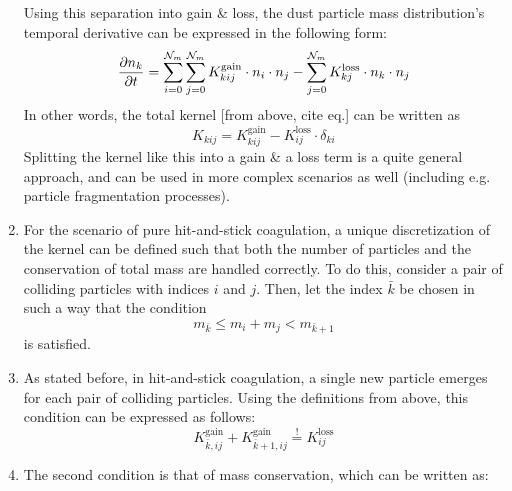 \begin{enumerate}
                Using this separation into gain \& loss, the dust particle mass distribution's
                temporal derivative can be expressed in the following form:
                \begin{equation}
                    \frac{\partial n_k}{\partial t}
                        =\sum_{i=0}^{\mathcal N_m}\sum_{j=0}^{\mathcal N_m}
                            K_{kij}^\text{gain}\cdot n_i\cdot n_j
                        -\sum_{j=0}^{\mathcal N_m}K_{kj}^\text{loss}\cdot n_k\cdot n_j
                \end{equation}
                In other words, the total kernel [from above, cite eq.] can be written as
                \begin{equation}
                    K_{kij}
                        =K_{kij}^\text{gain}
                        -K_{ij}^\text{loss}\cdot\delta_{ki}
                \end{equation}
                Splitting the kernel like this into a gain \& a loss term is a quite general
                approach, and can be used in more complex scenarios as well (including e.g.
                particle fragmentation processes).
            \item For the scenario of pure hit-and-stick coagulation, a unique discretization
                of the kernel can be defined such that both the number of particles and the
                conservation of total mass are handled correctly. To do this, consider a
                pair of colliding particles with indices $i$ and $j$. Then, let the index
                $\bar k$ be chosen in such a way that the condition
                \begin{equation}
                    m_{\bar k}\leq m_i+m_j<m_{\bar k+1}
                \end{equation}
                is satisfied.
            \item As stated before, in hit-and-stick coagulation, a single new particle emerges
                for each pair of colliding particles. Using the definitions from above, this
                condition can be expressed as follows:
                \begin{equation}
                    K_{\bar k,ij}^\text{gain}
                    +K_{\bar k+1,ij}^\text{gain}
                    \overset{!}{=}K_{ij}^\text{loss}
                \end{equation}
            \item The second condition is that of mass conservation, which can be written as:
                \begin{equation}

\end{equation}
\end{enumerate}
